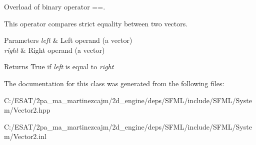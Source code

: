 Overload of binary operator ==. 

This operator compares strict equality between two vectors.


\begin{DoxyParams}{Parameters}
{\em left} & Left operand (a vector) \\
\hline
{\em right} & Right operand (a vector)\\
\hline
\end{DoxyParams}
\begin{DoxyReturn}{Returns}
True if {\itshape left} is equal to {\itshape right} 
\end{DoxyReturn}


The documentation for this class was generated from the following files\+:\begin{DoxyCompactItemize}
\item 
C\+:/\+E\+S\+A\+T/2pa\+\_\+ma\+\_\+martinezcajm/2d\+\_\+engine/deps/\+S\+F\+M\+L/include/\+S\+F\+M\+L/\+System/Vector2.\+hpp\item 
C\+:/\+E\+S\+A\+T/2pa\+\_\+ma\+\_\+martinezcajm/2d\+\_\+engine/deps/\+S\+F\+M\+L/include/\+S\+F\+M\+L/\+System/Vector2.\+inl\end{DoxyCompactItemize}
